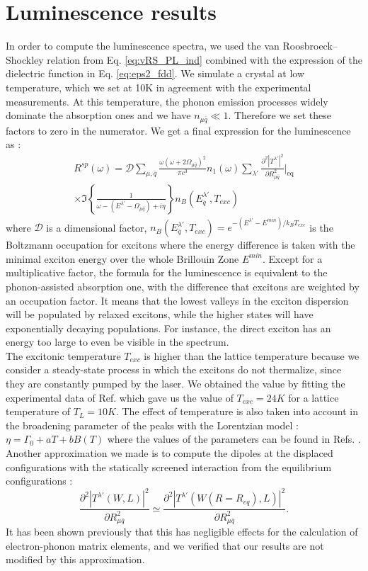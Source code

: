 %
\section{Luminescence results}
In order to compute the luminescence spectra, we used the van Roosbroeck--Shockley relation from Eq. \eqref{eq:vRS_PL_ind} combined with the expression of the dielectric function in Eq. \eqref{eq:eps2_fdd}. We simulate a crystal at low temperature, which we set at 10K in agreement with the experimental measurements. At this temperature, the phonon emission processes widely dominate the absorption ones and we have $n_{\mu \bar{q}} \ll  1$. Therefore we set these factors to zero in the numerator. We get a final expression for the luminescence as :
\begin{multline}
	R^{sp}(\omega)= \mathcal{D} \sum_{\mu,{\bar{q}}} \frac{\omega(\omega + 2\Omega_{\mu \bar{q}})^2}{\pi c^3 } n_1(\omega) \sum_{\lambda'} \frac{\partial^2 |T^{\lambda'}|^2 }{\partial R_{\mu\bar{q}}^2}\biggr|_{\text{eq}} \\ \times	\Im \left\{\frac{1}{\omega-(E^{\lambda'}-\Omega_{\mu \bar{q}})+i\eta}\right\} n_B(E^{\lambda'}_{\bar{q}},T_{exc}) \label{eq:strain_vRS_PL}
\end{multline}
where $\mathcal{D}$ is a dimensional factor, $n_B(E^{\lambda'}_{\bar{q}},T_{exc}) = e^{-(E^{\lambda'}-E^{min})/k_BT_{exc}}$ is the Boltzmann occupation for excitons where the energy difference is taken with the minimal exciton energy over the whole Brillouin Zone $E^{min}$. Except for a multiplicative factor, the formula for the luminescence is equivalent to the phonon-assisted absorption one, with the difference that excitons are weighted by an occupation factor. It means that the lowest valleys in the exciton dispersion will be populated by relaxed excitons, while the higher states will have exponentially decaying populations.
For instance, the direct exciton has an energy too large to even be visible in the spectrum.
\\
The excitonic temperature $T_{exc}$ is higher than the lattice temperature because we consider a steady-state process in which the excitons do not thermalize, since they are constantly pumped by the laser. We obtained the value by fitting the experimental data of Ref. \cite{cassabois2016hexagonal} which gave us the value of $T_{exc} = 24 K$ for a lattice temperature of $T_L = 10 K$. The effect of temperature is also taken into account in the broadening parameter of the peaks with the Lorentzian model : $\eta = \Gamma_0 + aT + bB(T)$ where the values of the parameters can be found in Refs. \cite{paleari2019exciton,vuong2017exciton}. Another approximation we made is to compute the dipoles at the displaced configurations with the statically screened interaction from the equilibrium configurations : 
\begin{equation}
	\frac{\partial^2 |T^{\lambda'} (W, L )|^2 }{\partial R_{\mu \bar{q}}^2} \simeq \frac{\partial^2 |T^{\lambda'} (W(R=R_{eq}), L) |^2 }{\partial R_{\mu \bar{q}}^2}.
\end{equation}
It has been shown previously that this has negligible effects for the calculation of electron-phonon matrix elements,\cite{faber2015exploring} and we verified that our results are not modified by this approximation. 

